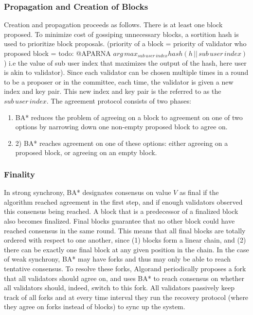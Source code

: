 \documentclass[10pt,journal,compsoc]{IEEEtran}
\begin{document}
\subsubsection{Propagation and Creation of Blocks}
Creation and propagation proceeds as follows. There is at least one block proposed. To minimize cost of gossiping unnecessary blocks, a sortition hash is used to prioritize block proposals. (priority of a block = priority of validator who proposed block = todo: @APARNA $arg\,max_{sub\,user\, index}hash(h\,||\,sub\,user\,index)$) i.e the value of sub user index that maximizes the output of the hash, here user is akin to validator). Since each validator can be chosen multiple times in a round to be a proposer or in the committee, each time, the validator is given a new index and key pair. This new index and key pair is the referred to as the $sub\,user\,index$.
The agreement protocol consists of two phases: 
\begin{enumerate}
    \item BA* reduces the problem of agreeing on a block to agreement on one of two options by narrowing down one non-empty proposed block to agree on.
    \item 2) BA* reaches agreement on one of these options: either agreeing on a proposed block, or agreeing on an empty block. 
\end{enumerate}

\subsubsection{Finality}
In strong synchrony, BA* designates consensus on value $V$ as final if the algorithm reached agreement in the first step, and if enough validators observed this consensus being reached. A block that is a predecessor of a finalized block also becomes finalized. Final blocks guarantee that no other block could have reached consensus in the same round. This means that all final blocks are totally ordered with respect to one another, since (1) blocks form a linear chain, and (2) there can be exactly one final block at any given position in the chain. In the case of weak synchrony, BA* may have forks and thus may only be able to reach tentative consensus. To resolve these forks, Algorand periodically proposes a fork that all validators should agree on, and uses BA* to reach consensus on whether all validators should, indeed, switch to this fork. All validators passively keep track of all forks and at every time interval they run the recovery protocol (where they agree on forks instead of blocks) to sync up the system.
\end{document}

